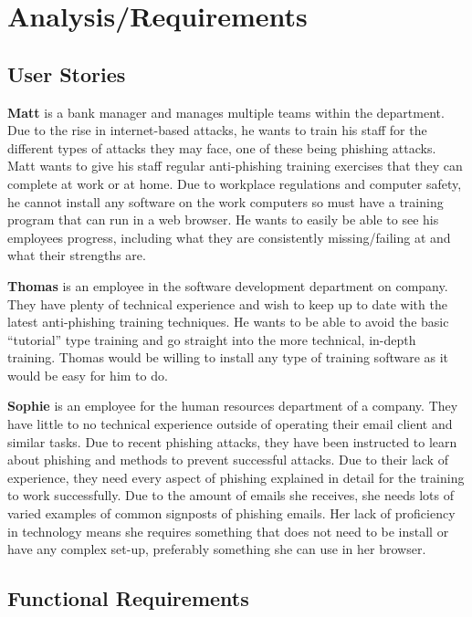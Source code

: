 \documentclass{l4proj}
\begin{document}
\chapter{Analysis/Requirements}

\section{User Stories}
\textbf{Matt} is a bank manager and manages multiple teams within the department. Due to the rise in internet-based attacks, he wants to train his staff for the different types of attacks they may face, one of these being phishing attacks. Matt wants to give his staff regular anti-phishing training exercises that they can complete at work or at home. Due to workplace regulations and computer safety, he cannot install any software on the work computers so must have a training program that can run in a web browser. He wants to easily be able to see his employees progress, including what they are consistently missing/failing at and what their strengths are. 

\textbf{Thomas} is an employee in the software development department on company. They have plenty of technical experience and wish to keep up to date with the latest anti-phishing training techniques. He wants to be able to avoid the basic “tutorial” type training and go straight into the more technical, in-depth training. Thomas would be willing to install any type of training software as it would be easy for him to do. 

\textbf{Sophie} is an employee for the human resources department of a company. They have little to no technical experience outside of operating their email client and similar tasks. Due to recent phishing attacks, they have been instructed to learn about phishing and methods to prevent successful attacks. Due to their lack of experience, they need every aspect of phishing explained in detail for the training to work successfully. Due to the amount of emails she receives, she needs lots of varied examples of common signposts of phishing emails. Her lack of proficiency in technology means she requires something that does not need to be install or have any complex set-up, preferably something she can use in her browser.

\section{Functional Requirements}
\end{document}
